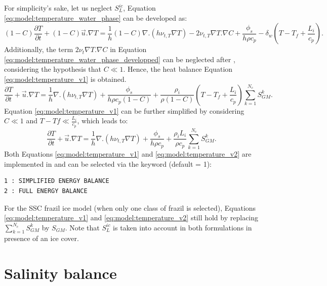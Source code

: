 For simplicity's sake, let us neglect $S_L^{ic}$, Equation \eqref{eq:model:temperature_water_phase} can be developed as:
\begin{equation}
(1-C)\frac{\partial T}{\partial t}+(1-C) \vec{u}. \nabla T =
\dfrac{1}{h}  (1-C) \nabla .(h \nu_{t,T} \nabla T)-2 \nu_{t,T} \nabla T. \nabla C+\frac{\phi_s }{h \rho c_{p}}
- \delta_w \left( T - T_f + \frac{L_i}{ c_{p}} \right).
\label{eq:model:temperature_water_phase_developped}
\end{equation}
Additionally, the term $2 \nu_{t} \nabla T. \nabla C$ in Equation \eqref{eq:model:temperature_water_phase_developped} can be neglected after \cite{holland_JFM_2005}, considering the hypothesis that $C\ll1$.
Hence, the heat balance Equation \eqref{eq:model:temperature_v1} is obtained.
\begin{equation}
\frac{\partial T}{\partial t} + \vec{u}. \nabla T= \dfrac{1}{h} 
\nabla .(h \nu_{t,T} \nabla T)
+\frac{\phi_s }{h \rho c_{p} (1-C)}
+ \frac{ \rho_i}{ \rho (1-C)}
\left(T - T_f + \frac{L_i}{ c_{p}} \right) \sum_{k=1}^{N_c} S^k_{GM}.
\label{eq:model:temperature_v1}
\end{equation}
Equation \eqref{eq:model:temperature_v1} can be further simplified by considering $C\ll1$ and $T-Tf \ll \frac{L_i}{c_p}$, which leads to:
\begin{equation}
\frac{\partial T}{\partial t}+ \vec{u}. \nabla T= \dfrac{1}{h} \nabla .( h\nu_{t,T} \nabla T) + \frac{\phi_s }{h \rho c_{p}}
+\frac{\rho_i L_i}{\rho c_{p}} \sum_{k=1}^{N_c} S^k_{GM}.
\label{eq:model:temperature_v2}
\end{equation}
Both Equations \eqref{eq:model:temperature_v1} and \eqref{eq:model:temperature_v2} are implemented
in \khione and can be selected via the keyword  (default = 1):
\begin{lstlisting}
1 : SIMPLIFIED ENERGY BALANCE
2 : FULL ENERGY BALANCE
\end{lstlisting}

For the SSC frazil ice model (when only one class of frazil is selected),
Equations \eqref{eq:model:temperature_v1} and \eqref{eq:model:temperature_v2} still
hold by replacing $\sum_{k=1}^{N_c} S^k_{GM}$ by $S_{GM}$.
Note that $S_L^{ic}$ is taken into account in both formulations in presence of an ice cover.

\section{Salinity balance}
\label{salinity_balance}

